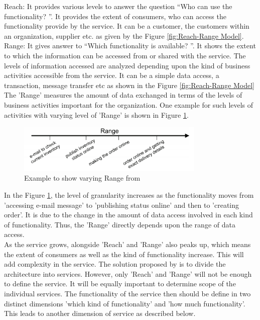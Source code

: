 Reach: It provides various levels to answer the question “Who can use the functionality? ”.  It provides the extent of consumers, who can access the functionality provide  by the service. It can be a customer, the customers within an organization, supplier etc. as given by the Figure \ref{fig:Reach-Range Model}.
\\
Range: It gives answer to “Which functionality is available? ”. It shows the extent to which the information can be accessed from or shared with the service. The levels of information accessed are analyzed depending upon the kind of business activities accessible from the service. It can be a simple data access, a transaction, message transfer etc as shown in the Figure \ref{fig:Reach-Range Model} The 'Range' measures the amount of data exchanged in terms of the levels of business activities important for the organization. One example for such levels of activities with varying level of 'Range' is shown in Figure \ref{fig:Range Example}.
\begin{figure}[H]
\begin{center}
\includegraphics[width=0.8\textwidth]{figures/Granularity-R3-two}
\caption{Example to show varying Range from \cite{Keen:2015aa, Weill:1998aa}}
\label{fig:Range Example}
\end{center}
\end{figure}
In the Figure \ref{fig:Range Example}, the level of granularity increases as the functionality moves from 'accessing e-mail message' to 'publishing status online' and then to 'creating order'. It is due to the change in the amount of data access involved in each kind of functionality. Thus, the 'Range' directly depends upon the range of data access.
\\
As the service grows,  alongside 'Reach' and 'Range' also peaks up, which means the extent of consumers as well as the kind of functionality increase. This will add complexity in the service. The solution proposed by \cite{Cockburn:2001aa} is to divide the architecture into services. However, only 'Reach' and 'Range' will not be enough to define the service. It will be equally important to determine scope of the individual services. The functionality of the service then should be define in two distinct dimensions 'which kind of functionality' and 'how much functionality'. This leads to another dimension of service as described below.
